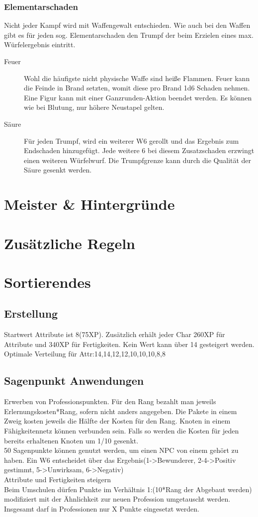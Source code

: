 \documentclass[a4paper,12pt,oneside]{book}
\begin{document}
\section{Elementarschaden}
Nicht jeder Kampf wird mit Waffengewalt entschieden. Wie auch bei den Waffen gibt es für jeden sog. Elementarschaden den Trumpf der beim Erzielen eines max. Würfelergebnis eintritt.
\begin{description}
\item[Feuer]Wohl die häufigste nicht physische Waffe sind heiße Flammen. Feuer kann die Feinde in Brand setzten, womit diese pro Brand 1d6 Schaden nehmen. Eine Figur kann mit einer Ganzrunden-Aktion beendet werden. Es können wie bei Blutung, nur höhere Neustapel gelten.
\item[Säure]Für jeden Trumpf, wird ein weiterer W6 gerollt und das Ergebnis zum Endschaden hinzugefügt. Jede weitere 6 bei diesem Zusatzschaden erzwingt einen weiteren Würfelwurf. Die Trumpfgrenze kann durch die Qualität der Säure gesenkt werden.
\end{description}

\part{Meister \& Hintergründe}
\setcounter{chapter}{0}
\part{Zusätzliche Regeln}
\setcounter{chapter}{0}

\part{Sortierendes}

\chapter{Erstellung}
Startwert Attribute ist 8(75XP).
Zusätzlich erhält jeder Char 260XP für Attribute und 340XP für Fertigkeiten. Kein Wert kann über 14 gesteigert werden.
Optimale Verteilung für Attr:14,14,12,12,10,10,10,8,8

\chapter{Sagenpunkt Anwendungen}
Erwerben von Professionspunkten. Für den Rang bezahlt man jeweils Erlernungskosten*Rang, sofern nicht anders angegeben. Die Pakete in einem Zweig kosten jeweils die Hälfte der Kosten für den Rang. Knoten in einem Fähigkeitennetz können verbunden sein. Falls so werden die Kosten für jeden bereits erhaltenen Knoten um 1/10 gesenkt.
\\50 Sagenpunkte können genutzt werden, um einen NPC von einem gehört zu haben. Ein W6 entscheidet über das Ergebnis(1->Bewunderer, 2-4->Positiv gestimmt, 5->Unwirksam, 6->Negativ)
\\Attribute und Fertigkeiten steigern
\\Beim Umschulen dürfen Punkte im Verhältnis 1:(10*Rang der Abgebaut werden) modifiziert mit der Ähnlichkeit zur neuen Profession umgetauscht werden. 
\\Insgesamt darf in Professionen nur X Punkte eingesetzt werden.
\end{document}
